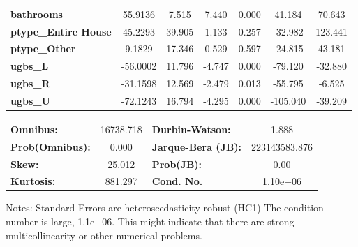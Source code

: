 \begin{center}
\begin{tabular}{lcccccc}
\textbf{bathrooms}              &      55.9136  &        7.515     &     7.440  &         0.000        &       41.184    &       70.643     \\
\textbf{ptype\_Entire House}    &      45.2293  &       39.905     &     1.133  &         0.257        &      -32.982    &      123.441     \\
\textbf{ptype\_Other}           &       9.1829  &       17.346     &     0.529  &         0.597        &      -24.815    &       43.181     \\
\textbf{ugbs\_L}                &     -56.0002  &       11.796     &    -4.747  &         0.000        &      -79.120    &      -32.880     \\
\textbf{ugbs\_R}                &     -31.1598  &       12.569     &    -2.479  &         0.013        &      -55.795    &       -6.525     \\
\textbf{ugbs\_U}                &     -72.1243  &       16.794     &    -4.295  &         0.000        &     -105.040    &      -39.209     \\
\bottomrule
\end{tabular}
\begin{tabular}{lclc}
\textbf{Omnibus:}       & 16738.718 & \textbf{  Durbin-Watson:     } &       1.888    \\
\textbf{Prob(Omnibus):} &    0.000  & \textbf{  Jarque-Bera (JB):  } & 223143583.876  \\
\textbf{Skew:}          &   25.012  & \textbf{  Prob(JB):          } &        0.00    \\
\textbf{Kurtosis:}      &  881.297  & \textbf{  Cond. No.          } &    1.10e+06    \\
\bottomrule
\end{tabular}
\end{center}

Notes: \newline
 [1] Standard Errors are heteroscedasticity robust (HC1) \newline
 [2] The condition number is large, 1.1e+06. This might indicate that there are \newline
 strong multicollinearity or other numerical problems.
